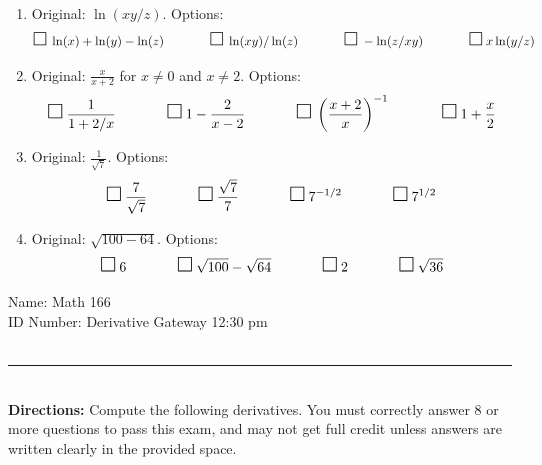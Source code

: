 \documentclass{article}
\begin{document}
{\begin{enumerate}
\[\]
\item Original: $\ln(xy/z)$.  Options:
\[
\scalebox{1.5}{$\square$}\: \ln(x) + \ln(y) - \ln(z) \hspace{.5 in} \scalebox{1.5}{$\square$}\: \ln(xy)/\ln(z) \hspace{.5 in} \scalebox{1.5}{$\square$}\: -\ln(z/xy) \hspace{.5 in} \scalebox{1.5}{$\square$}\: x\ln(y/z)
\]
\item Original: $\frac{x}{x + 2}$ for $x \neq 0$ and $x \neq 2$.  Options:
\[
\scalebox{1.5}{$\square$}\: \frac{1}{1 + 2/x}  \hspace{.5 in} \scalebox{1.5}{$\square$}\: 1 - \frac{2}{x - 2} \hspace{.5 in} \scalebox{1.5}{$\square$}\: \left( \frac{x+2}{x}\right)^{-1}\hspace{.5 in} \scalebox{1.5}{$\square$}\:1 + \frac{x}{2}
\]
\item Original: $\frac{1}{\sqrt{7}}$.  Options:
\[
\scalebox{1.5}{$\square$}\: \frac{7}{\sqrt{7}} \hspace{.5 in} \scalebox{1.5}{$\square$}\: \frac{\sqrt{7}}{7} \hspace{.5 in} \scalebox{1.5}{$\square$}\: 7^{-1/2} \hspace{.5 in} \scalebox{1.5}{$\square$}\: 7^{1/2}
\]
\item Original: $\sqrt{100 - 64}$.  Options:
\[
\scalebox{1.5}{$\square$}\: 6 \hspace{.5 in} \scalebox{1.5}{$\square$}\:  \sqrt{100} - \sqrt{64} \hspace{.5 in} \scalebox{1.5}{$\square$}\: 2 \hspace{.5 in} \scalebox{1.5}{$\square$}\: \sqrt{36}
\]


\end{enumerate}


\newpage

\large
\noindent Name: \underline{\hspace{2.5 in}}  \hfill Math 166\\
\noindent ID Number: \underline{\hspace{2.5 in}} \hfill Derivative Gateway 12:30 pm\\\ 
\\
\hrule\ \\
{\bf Directions:} Compute the following derivatives.  You must correctly answer 8 or more questions to pass this exam, and may not get full credit unless answers are written clearly in the provided space. \\

}
\end{document}
